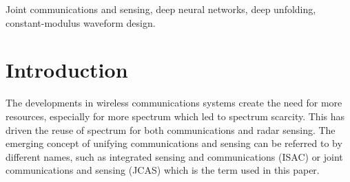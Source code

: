 \documentclass[conference]{IEEEtran}
\begin{document}
%
\begin{abstract}
Joint communications and sensing (JCAS) systems have recently emerged as a promising technology to utilize the scarce spectrum in wireless networks and to reuse the same hardware to save infrastructure costs. In practical JCAS systems, dual functional constant-modulus waveforms can be employed to avoid signal distortion in nonlinear power amplifiers. However, the designs of such waveforms are very challenging due to the nonconvex constant-modulus constraint. The conventional branch-and-bound (BnB) method can achieve optimal solution but at the cost of exponential complexity and long run time. In this paper, we propose an efficient deep unfolding method for the constant-modulus waveform design in a multiuser multiple-input multiple-output (MIMO) JCAS system. The deep unfolding model has a sparsely-connected structure and is trained in an unsupervised fashion. It achieves good communications-sensing performance tradeoff while maintaining low computational complexity and low run time. Specifically, our numerical results show that the proposed deep unfolding scheme achieves a similar achievable rate compared to the conventional BnB method with 30 times faster execution time.
\end{abstract}

\begin{IEEEkeywords}
Joint communications and sensing, deep neural networks, deep unfolding, constant-modulus waveform design.
\end{IEEEkeywords}

\section{Introduction}
The developments in wireless communications systems create the need for more resources, especially for more spectrum which led to spectrum scarcity. This has driven the reuse of spectrum for both communications and radar sensing. The emerging concept of unifying communications and sensing can be referred to by different names, such as integrated sensing and communications (ISAC) \cite{ouyang2022performance, liu2022integrated} or joint communications and sensing (JCAS) \cite{zhang2018multibeam} which is the term used in this paper. %
\end{document}
